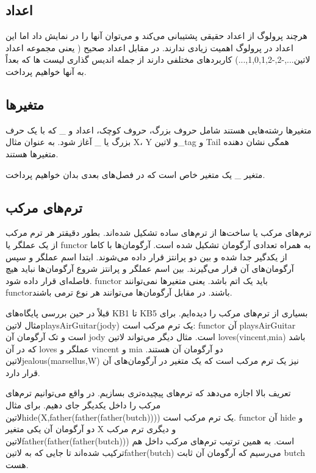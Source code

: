 \subsection{اعداد}

هرچند پرولوگ از اعداد حقیقی پشتیبانی می‌کند و می‌توان آنها را در نمایش داد اما این اعداد در پرولوگ اهمیت زیادی ندارند. در مقابل اعداد صحیح ( یعنی مجموعه اعداد ‌لاتین{...,-2,-1,0,1,2,...}) کاربردهای مختلفی دارند از جمله اندیس گذاری لیست ها که بعداً به آنها خواهیم پرداخت.

\subsection{متغیرها}

متغیرها رشته‌هایی هستند شامل حروف بزرگ، حروف کوچک، اعداد و \_ که با یک حرف بزرگ یا \_ آغاز شود. به عنوان مثال X‌، Y و ‌لاتین{\_tag} و Tail همگی نشان دهنده متغیرها هستند.

متغیر \_ یک متغیر خاص است که در فصل‌های بعدی بدان خواهیم پرداخت.

\subsection{ترم‌های مرکب}

ترم‌های مرکب یا ساخت‌ها از ترم‌های ساده تشکیل شده‌اند. بطور دقیقتر هر ترم مرکب از یک عملگر یا functor به همراه تعدادی آرگومان تشکیل شده است. آرگومان‌ها با کاما از یکدگیر جدا شده و بین دو پرانتز قرار داده می‌شوند. ابتدا اسم عملگر و سپس آرگومان‌های آن قرار می‌گیرند. بین اسم عملگر و پرانتز شروع آرگومان‌ها نباید هیچ فاصله‌ای قرار داده شود. functor باید یک اتم باشد. یعنی متغیرها نمی‌توانند functorباشند. در مقابل آرگومان‌ها می‌توانند هر نوع ترمی باشند.

قبلاً در حین بررسی پایگاه‌های KB1 تا KB5 بسیاری از ترم‌های مرکب را دیده‌ایم. برای مثال ‌لاتین{playsAirGuitar(jody)} یک ترم مرکب است: functor آن playsAirGuitar  است و تک آرگومان آن jody است. مثال دیگر می‌تواند ‌لاتین{ loves(vincent,mia)} باشد که در آن loves عملگر و vincent و mia دو آرگومان آن هستند. ‌لاتین{jealous(marsellus,W)} نیز یک ترم مرکب است که یک متغیر در آرگومان‌های آن قرار دارد.

تعریف بالا اجازه می‌دهد که ترم‌های پیچیده‌تری بسازیم. در واقع می‌توانیم ترم‌های مرکب را داخل یکدیگر جای دهیم. برای مثال ‌لاتین{hide(X,father(father(father(butch))))} یک ترم مرکب است. functor آن hide و دو آرگومان آن یکی متغیر X و دیگری ترم مرکب \\‌لاتین{father(father(father(butch)))} است. به همین ترتیب ترم‌های مرکب داخل هم ترکیب شده‌اند تا جایی که به ‌لاتین{father(butch)} می‌رسیم که آرگومان آن ثابت butch هست.

